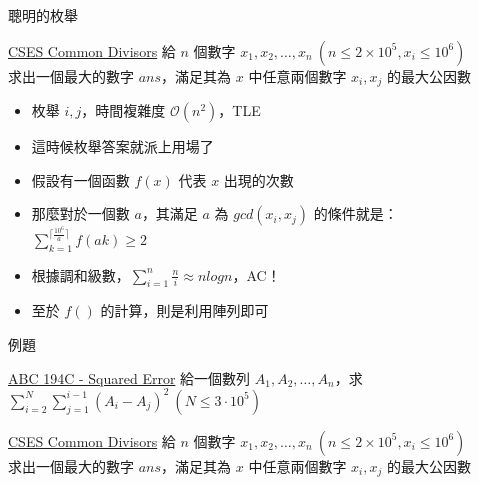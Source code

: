 \documentclass[aspectratio=169]{beamer}
\begin{document}
    \begin{frame}{聰明的枚舉}
        \begin{block}{\href{https://cses.fi/problemset/task/1081}{CSES Common Divisors}}
            給 $n$ 個數字 $x_1, x_2, \dots , x_n\ (n \le 2 \times 10^5, x_i \le 10^6)$\\
            求出一個最大的數字 $ans$，滿足其為 $x$ 中任意兩個數字 $x_i, x_j$ 的最大公因數
        \end{block}

        \begin{itemize}
            \item<1-> 枚舉 $i, j$，時間複雜度 $\mathcal{O}(n^2)$，TLE
            \item<2-> 這時候枚舉答案就派上用場了
            \item<3-> 假設有一個函數 $f(x)$ 代表 $x$ 出現的次數
            \item<3-> 那麼對於一個數 $a$，其滿足 $a$ 為 $gcd(x_i, x_j)$ 的條件就是：
            $\displaystyle\sum_{k = 1}^{\lceil \frac{10^6}{a} \rceil}{f(ak)} \ge 2$
            \item<4-> 根據調和級數，$\displaystyle\sum_{i = 1}^{n}{\frac{n}{i}} \approx nlogn$，AC！
            \item<5-> 至於 $f()$ 的計算，則是利用陣列即可
        \end{itemize}
    \end{frame}

    \begin{frame}{例題}
        \begin{block}{\href{https://atcoder.jp/contests/abc194/tasks/abc194_c}{ABC 194C - Squared Error}}
            給一個數列 $A_1, A_2, \dots, A_n$，求 $\displaystyle\sum_{i = 2}^{N}{\sum_{j = 1}^{i - 1}{(A_i - A_j) ^ 2}}\ (N \le 3 \cdot 10^5)$
        \end{block}

        \begin{block}{\href{https://cses.fi/problemset/task/1081}{CSES Common Divisors}}
            給 $n$ 個數字 $x_1, x_2, \dots , x_n\ (n \le 2 \times 10^5, x_i \le 10^6)$\\
            求出一個最大的數字 $ans$，滿足其為 $x$ 中任意兩個數字 $x_i, x_j$ 的最大公因數
        \end{block}
    \end{frame}
\end{document}
